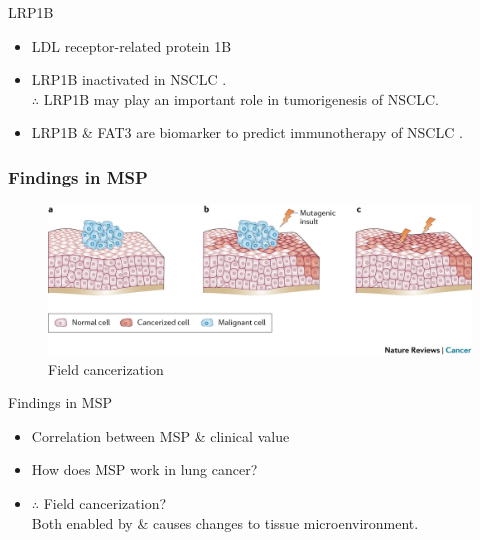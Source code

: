 \documentclass{beamer}
\begin{document}
\begin{frame}[allowframebreaks]
                \begin{block}{LRP1B}
                    \begin{itemize}
                        \item LDL receptor-related protein 1B
                        \item LRP1B inactivated in NSCLC \cite{LRP1B-01}. \\
                            $\therefore$ LRP1B may play an important role in tumorigenesis of NSCLC.
                        \item LRP1B \& FAT3 are biomarker to predict immunotherapy of NSCLC \cite{LRP1B-02}.
                    \end{itemize}
                \end{block}
            \end{frame}

            \begin{frame}
                \frametitle{Findings in MSP}

                \begin{figure}
                    \includegraphics[width=0.6 \linewidth]{figures/LungCancer/cancerization.jpg}
                    \caption{Field cancerization \protect\cite{cancerization-01}}
                \end{figure}

                \begin{block}{Findings in MSP}
                    \begin{itemize}
                        \item Correlation between MSP \& clinical value
                        \item How does MSP work in lung cancer?
                        \item $\therefore$ Field cancerization? \\
                            Both enabled by \& causes changes to tissue microenvironment.
                    \end{itemize}
                \end{block}
            \end{frame}
\end{document}
